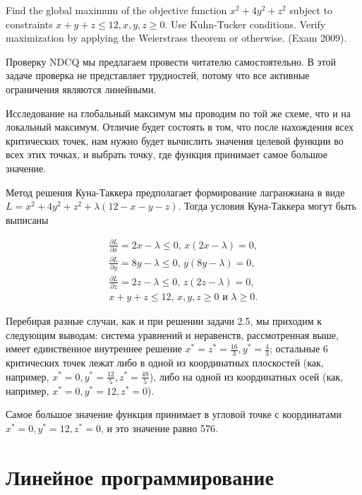 \begin{problem}
Find the global maximum of the objective function $x^{2} +4y^{2} +z^{2} $ subject to constraints $x+y+z\le 12, x,y,z\ge 0$. Use Kuhn-Tucker conditions. Verify maximization by applying the Weierstrass theorem or otherwise. (Exam 2009).
\end{problem}

\begin{solution}

Проверку NDCQ мы предлагаем провести читателю самостоятельно. В этой задаче проверка не представляет трудностей, потому что все активные ограничения являются линейными. 


Исследование на глобальный максимум мы проводим по той же схеме, что и на локальный максимум. Отличие будет состоять в том, что после нахождения всех критических точек, нам нужно будет вычислить значения целевой функции во всех этих точках, и выбрать точку, где функция принимает самое большое значение.

Метод решения Куна-Таккера предполагает формирование лагранжиана в виде $L=x^{2} +4y^{2} +z^{2} +\lambda (12-x-y-z)$. Тогда условия Куна-Таккера могут быть выписаны

\begin{align*}
\frac{\partial L}{\partial x} =2x-\lambda \le 0, \, x(2x-\lambda )=0, \\
\frac{\partial L}{\partial y} =8y-\lambda \le 0, \, y(8y-\lambda )=0, \\
\frac{\partial L}{\partial z} =2z-\lambda \le 0, \, z(2z-\lambda )=0,  \\
x+y+z\le 12, \, x,y,z\ge 0 \text{ и } \lambda \ge 0.
\end{align*}

Перебирая разные случаи, как и при решении задачи 2.5, мы приходим к следующим выводам: система уравнений и неравенств, рассмотренная выше, имеет единственное внутреннее решение $x^*=z^*=\frac{16}{3} , y^*=\frac{4}{3} $; остальные 6 критических точек лежат либо в одной из координатных плоскостей (как, например, $x^*=0, y^*=\frac{12}{5} , z^*=\frac{48}{5} $), либо на одной из координатных осей (как, например, $x^*=0, y^*=12, z^*=0$).

Самое большое значение функция принимает в угловой точке с координатами $x^*=0, y^*=12, z^*=0$, и это значение равно 576.
\end{solution}



\section{Линейное программирование}

